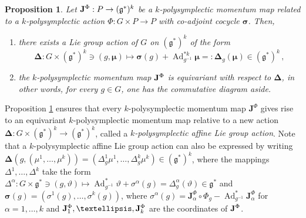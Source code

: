 \documentclass[11pt]{article}
\theoremstyle{plain}
\newtheorem{proposition}[theorem]{Proposition}
\theoremstyle{definition}
\DeclareMathOperator{\Ad}{Ad}
\numberwithin{equation}{section}
\begin{document}
\begin{proposition}\label{Prop::GenEqJPolySym}
Let ${\bf J}^\Phi:P\rightarrow (\mathfrak{g}^*)^k$ be a $k$-polysymplectic momentum map related to a $k$-polysymplectic action $\Phi:G\times P\rightarrow P$ with co-adjoint cocycle $\boldsymbol\sigma$. Then, 

\begin{minipage}{12cm}
\begin{enumerate}[{\rm(1)}]
    \item there exists a Lie group action of $G$ on $(\mathfrak{g}^*)^k$ of the form
    \[
    \boldsymbol\Delta:G\times (\mathfrak{g}^*)^k\ni(g,\boldsymbol \mu)\mapsto \boldsymbol\sigma(g)+\Ad^{*k}_{g^{-1}}\boldsymbol\mu=:\boldsymbol\Delta_g(\boldsymbol\mu)\in(\mathfrak{g}^*)^k\,,
    \]   
    \item the $k$-polysymplectic momentum map ${\bf J}^\Phi$ is equivariant with respect to $\boldsymbol\Delta$, in other words, for every $g\in G$, one has the commutative diagram aside.
\end{enumerate}
\end{minipage}
\begin{minipage}{4cm}
\begin{center}
    \end{center}
\end{minipage}
\end{proposition}


Proposition \ref{Prop::GenEqJPolySym} ensures that every $k$-polysymplectic momentum map $\mathbf{J}^\Phi$ gives rise to an equivariant $k$-polysymplectic momentum map relative to a new action $\boldsymbol\Delta: G\times(\mathfrak{g}^*)^k\rightarrow(\mathfrak{g}^*)^k$, called a {\it $k$-polysymplectic affine Lie group action}. Note that a $k$-polysymplectic affine Lie group action can also be expressed by writing $\boldsymbol\Delta(g,(\mu^1,
\ldots,\mu^k))=(\Delta^1_g\mu^1,\ldots,\Delta^k_g\mu^k)\in (\mathfrak{g}^*)^k$, where the mappings $\Delta^1,\ldots,\Delta^k$ take the form $\Delta^\alpha: G\times \mathfrak{g}^*\ni(g,\vartheta)\mapsto \Ad_{g^{-1}}^*\vartheta+\sigma^\alpha(g)=\Delta_g^\alpha(\vartheta)\in\mathfrak{g}^*$  and ${\boldsymbol \sigma}(g)=(\sigma^1(g),\ldots,\sigma^k(g))$, where  $\sigma^\alpha(g)=\mathbf{J}^\Phi_\alpha\circ\Phi_g-\Ad^*_{g^{-1}}\mathbf{J}^\Phi_\alpha$ for $\alpha=1,\ldots,k$ and ${\bf J}^\Phi_1,\ldots, {\bf J}^\Phi_k$ are the coordinates of ${\bf J}^\Phi$.
\end{document}
